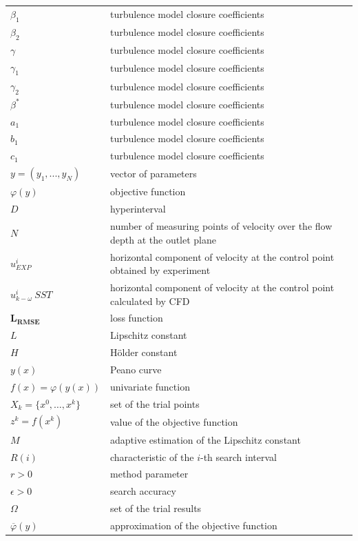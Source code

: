 \documentclass[mathematics,article,submit,pdftex,moreauthors]{Definitions/mdpi}
\begin{document}
\begin{table}[H]
\begin{tabularx}{\textwidth}{ll}
$\beta_1$ & turbulence model closure coefficients \\
$\beta_2$ & turbulence model closure coefficients \\
$\gamma$ & turbulence model closure coefficients \\
$\gamma_1$ & turbulence model closure coefficients \\
$\gamma_2$ & turbulence model closure coefficients \\
$\beta^*$ & turbulence model closure coefficients \\
$a_1$ & turbulence model closure coefficients \\
$b_1$ & turbulence model closure coefficients \\
$c_1$ & turbulence model closure coefficients \\
$y = (y_1, ..., y_N)$ & vector of parameters\\
$\varphi(y)$		& objective function	\\
$D$	& hyperinterval	\\
$N$		& number of measuring points of velocity over the flow depth at the outlet plane	\\
$u^i_{EXP}$		& horizontal component of velocity at the control point obtained by experiment	\\
$u^i_{k-\omega}\ SST$		& horizontal component of velocity at the control point calculated by CFD	\\
$\boldsymbol{L_{RMSE}}$		& loss function	\\
$L$		& Lipschitz constant	\\
$H$		& H{\"o}lder constant	\\
$y(x)$		& Peano curve	\\
$f(x) = \varphi(y(x))$		& univariate function	\\
$X_k=\{x^0,\dots,x^k\} $ & set of the trial points \\
$z^k = f(x^k)$ & value of the objective function \\
$M$		& adaptive estimation of the Lipschitz constant \\
$R(i)$		& characteristic of the $i$-th search interval\\
$r>0$		& method parameter	\\
$\epsilon > 0$		& search accuracy	\\
$\Omega $ & set of the trial results \\
$\overline{\varphi}(y)$ & approximation of the objective function \\
\bottomrule
\end{tabularx}
\end{table}
\end{document}
